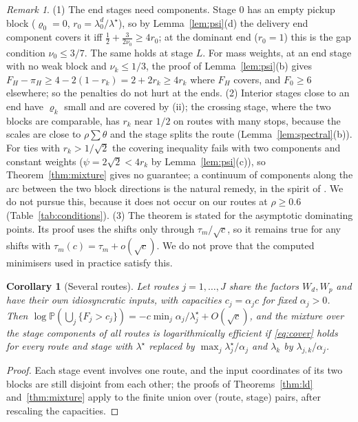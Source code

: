 \documentclass[11pt]{article}
\newtheorem{corollary}{Corollary}
\theoremstyle{definition}
\theoremstyle{remark}
\newtheorem{remark}{Remark}
\renewcommand{\P}{\mathbb{P}}
\begin{document}
\begin{remark}
(1) The end stages need components. Stage $0$ has an empty pickup block ($\varrho_0=0$,
$r_0=\lambda^d_0/\lambda^\star$), so by Lemma~\ref{lem:psi}(d) the delivery end
component covers it iff $\frac12+\frac3{2\nu_0}\ge4r_0$; at the dominant end ($r_0=1$)
this is the gap condition $\nu_0\le3/7$. The same holds at stage $L$. For mass
weights, at an end stage with no weak block and $\nu_k\le1/3$, the proof of
Lemma~\ref{lem:psi}(b) gives $F_H-\pi_H\ge4-2(1-r_k)=2+2r_k\ge4r_k$ where $F_H$ covers,
and $F_0\ge6$ elsewhere; so the penalties do not hurt at the ends.
(2) Interior stages close to an end have $\varrho_k$ small and are covered by (ii); the
crossing stage, where the two blocks are comparable, has $r_k$ near $1/2$ on routes with
many stops, because the scales are close to $\rho\sum\theta$ and the stage splits the route
(Lemma~\ref{lem:spectral}(b)). For ties with $r_k>1/\sqrt2$ the covering inequality fails with two
components and constant weights ($\psi=2\sqrt2<4r_k$ by Lemma~\ref{lem:psi}(c)), so
Theorem~\ref{thm:mixture} gives no guarantee; a continuum of components along the arc
between the two block directions is the natural remedy, in the spirit of
\citet{DupuisWang2007}. We do not pursue this, because it does not occur on our routes at
$\rho\ge0.6$ (Table~\ref{tab:conditions}).
(3) The theorem is stated for the asymptotic dominating points. Its proof uses the shifts
only through $\tau_m/\sqrt c$, so it remains true for any shifts with
$\tau_m(c)=\tau_{m}+o(\sqrt c)$. We do not prove that the computed minimisers used in
practice satisfy this.
\end{remark}

\begin{corollary}[Several routes]\label{cor:plan}
Let routes $j=1,\dots,J$ share the factors $W_d,W_p$ and have their own idiosyncratic
inputs, with capacities $c_j=\alpha_jc$ for fixed $\alpha_j>0$. Then
$\log\P(\bigcup_j\{F_j>c_j\})=-c\min_j\alpha_j/\lambda^\star_j+O(\sqrt c)$, and the
mixture over the stage components of all routes is logarithmically efficient if
\eqref{eq:cover} holds for every route and stage with $\lambda^\star$ replaced by
$\max_j\lambda^\star_j/\alpha_j$ and $\lambda_k$ by $\lambda_{j,k}/\alpha_j$.
\end{corollary}

\begin{proof}
Each stage event involves one route, and the input coordinates of its two blocks are
still disjoint from each other; the proofs of Theorems~\ref{thm:ld} and~\ref{thm:mixture}
apply to the finite union over (route, stage) pairs, after rescaling the capacities.
\end{proof}
\end{document}
